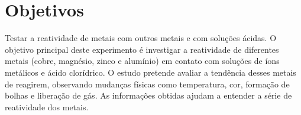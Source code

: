 \chapter{Objetivos}

Testar a reatividade de metais com outros metais e com soluções ácidas.
O objetivo principal deste experimento é investigar a reatividade de diferentes metais (cobre, magnésio, zinco e alumínio) em contato com soluções de íons metálicos e ácido clorídrico. O estudo pretende avaliar a tendência desses metais de reagirem, observando mudanças físicas como temperatura, cor, formação de bolhas e liberação de gás. As informações obtidas ajudam a entender a série de reatividade dos metais.

